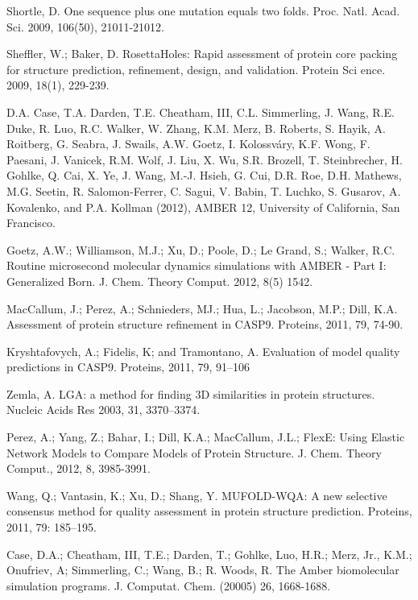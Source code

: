 \documentclass[12pt]{article}
\begin{document}
\begin{thebibliography}{99}
Shortle, D. One sequence plus one mutation equals two folds. Proc. Natl. Acad. Sci. 2009, 106(50), 21011-21012.

Sheffler, W.; Baker, D. RosettaHoles: Rapid assessment of protein core packing for structure prediction, refinement, design, and validation. Protein Sci
ence. 2009, 18(1), 229-239.

D.A. Case, T.A. Darden, T.E. Cheatham, III, C.L. Simmerling, J. Wang, R.E. Duke, R. Luo, R.C. Walker, W. Zhang, K.M. Merz, B. Roberts, S. Hayik, A. Roitberg, G. Seabra, J. Swails, A.W. Goetz, I. Kolossváry, K.F. Wong, F. Paesani, J. Vanicek, R.M. Wolf, J. Liu, X. Wu, S.R. Brozell, T. Steinbrecher, H. Gohlke, Q. Cai, X. Ye, J. Wang, M.-J. Hsieh, G. Cui, D.R. Roe, D.H. Mathews, M.G. Seetin, R. Salomon-Ferrer, C. Sagui, V. Babin, T. Luchko, S. Gusarov, A. Kovalenko, and P.A. Kollman (2012), AMBER 12, University of California, San Francisco.

Goetz, A.W.; Williamson, M.J.; Xu, D.; Poole, D.; Le Grand, S.; Walker, R.C. Routine microsecond molecular dynamics simulations with AMBER - Part I: Generalized
Born. J. Chem. Theory Comput. 2012, 8(5) 1542.

MacCallum, J.; Perez, A.; Schnieders, MJ.; Hua, L.; Jacobson, M.P.; Dill, K.A. Assessment of protein structure refinement
in CASP9. Proteins, 2011, 79, 74-90.

Kryshtafovych, A.; Fidelis, K; and Tramontano, A. Evaluation of model quality predictions in CASP9. Proteins, 2011, 79, 91–106

Zemla, A. LGA: a method for finding 3D similarities in protein structures. Nucleic Acids Res 2003, 31, 3370–3374.

Perez, A.; Yang, Z.; Bahar, I.; Dill, K.A.; MacCallum, J.L.; FlexE: Using Elastic Network Models to Compare Models of Protein Structure. J. Chem. Theory Comput., 2012, 8, 3985-3991.

Wang, Q.; Vantasin, K.; Xu, D.; Shang, Y. MUFOLD-WQA: A new selective consensus method for quality assessment in protein structure prediction.
Proteins, 2011, 79: 185–195.

Case, D.A.; Cheatham, III, T.E.; Darden, T.; Gohlke, Luo, H.R.; Merz, Jr., K.M.;  Onufriev, A; Simmerling, C.;
Wang, B.; R. Woods, R. The Amber biomolecular simulation programs. J. Computat. Chem. (20005) 26, 1668-1688.

\end{thebibliography}
\end{document}

